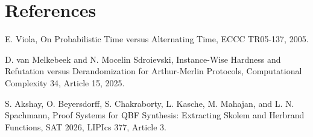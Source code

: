 \documentclass[11pt]{article}
\begin{document}
\section*{References}
E. Viola, On Probabilistic Time versus Alternating Time, ECCC TR05-137, 2005.

D. van Melkebeek and N. Mocelin Sdroievski, Instance-Wise Hardness and Refutation versus Derandomization for Arthur-Merlin Protocols, Computational Complexity 34, Article 15, 2025.

S. Akshay, O. Beyersdorff, S. Chakraborty, L. Kasche, M. Mahajan, and L. N. Spachmann, Proof Systems for QBF Synthesis: Extracting Skolem and Herbrand Functions, SAT 2026, LIPIcs 377, Article 3.
\end{document}
